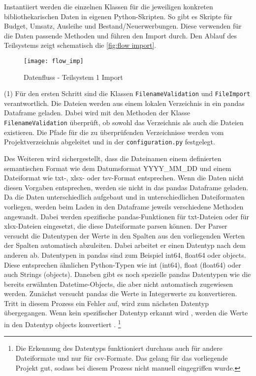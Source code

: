     Instantiiert werden die einzelnen Klassen für die jeweiligen konkreten bibliothekarischen Daten in eigenen Python-Skripten. 
    So gibt es Skripte für Budget, Umsatz, Ausleihe und Bestand/Neuerwerbungen. Diese verwenden für die Daten passende Methoden
    und führen den Import durch.
    Den Ablauf des Teilsystems zeigt schematisch die \autoref{fig:flow import}.

    \begin{figure}[H]
        \centering
            \texttt{[image: flow\_imp]}
            \caption{Datenfluss - Teilsystem 1 Import}
            \label{fig:flow import}
    \end{figure}

    
    (1) Für den ersten Schritt sind die Klassen \texttt{FilenameValidation} und \texttt{FileImport} verantwortlich.
    Die Dateien werden aus einem lokalen Verzeichnis in ein pandas Dataframe geladen. 
    Dabei wird mit den Methoden der Klasse \texttt{FilenameValidation} überprüft, ob sowohl das Verzeichnis als auch die Dateien existieren.
    Die Pfade für die zu überprüfenden Verzeichnisse werden vom Projektverzeichnis abgeleitet und in der \texttt{configuration.py} festgelegt.
    
    Des Weiteren wird sichergestellt, dass die Dateinamen einem definierten semantischen Format wie dem Datumsformat YYYY\_MM\_DD und 
    einem Dateiformat wie txt-, xlsx- oder tsv-Format entsprechen. Wenn die Daten nicht diesen Vorgaben entsprechen, werden sie nicht in
    das pandas Dataframe geladen. Da die Daten unterschiedlich aufgebaut und in unterschiedlichen Dateiformaten vorliegen, 
    werden beim Laden in den Dataframe jeweils verschiedene Methoden angewandt. Dabei werden spezifische pandas-Funktionen für 
    txt-Dateien oder für xlsx-Dateien eingesetzt, die diese Dateiformate parsen können. 
    Der Parser versucht die Datentypen der Werte in den Spalten aus den vorliegenden Werten der Spalten automatisch abzuleiten. 
    Dabei arbeitet er einen Datentyp nach dem anderen ab. Datentypen in pandas sind zum Beispiel int64, float64 oder objects. 
    Diese entsprechen ähnlichen Python-Typen wie int (int64), float (float64) oder auch Strings (objects). Daneben gibt es noch spezielle pandas Datentypen wie die bereits erwähnten Datetime-Objects, die aber nicht automatisch zugewiesen werden.
    Zunächst versucht pandas die Werte in Integerwerte zu konvertieren. Tritt in diesem Prozess ein Fehler auf, 
    wird zum nächsten Datentyp übergegangen. Wenn kein spezifischer Datentyp erkannt wird , werden die Werte in den Datentyp objects konvertiert \cite[Vgl.][]{golubin_how_2021}.
    \footnote{Die Erkennung des Datentyps funktioniert durchaus auch für andere Dateiformate und nur für csv-Formate. Das gelang für das vorliegende Projekt gut, sodass
    bei diesem Prozess nicht manuell eingegriffen wurde.}
    
